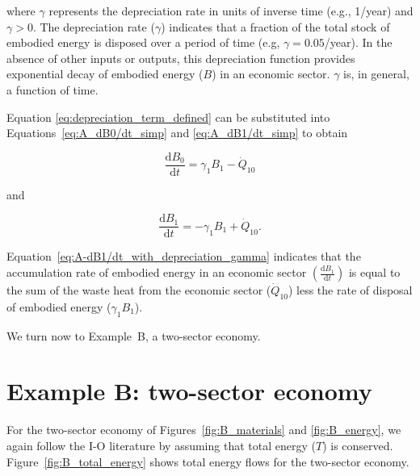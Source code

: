 \noindent where $\gamma$ represents the depreciation rate 
in units of inverse time (e.g., 1/year) and $\gamma > 0$. 
The depreciation rate ($\gamma$) indicates that 
a fraction of the total stock of embodied energy 
is disposed over a period of time (e.g, $\gamma = 0.05$/year). 
In the absence of other inputs or outputs, 
this depreciation function provides exponential decay 
of embodied energy ($B$) in an economic sector. 
$\gamma$ is, in general, a function of time.

Equation \ref{eq:depreciation_term_defined} 
can be substituted into Equations~\ref{eq:A_dB0/dt_simp}
and \ref{eq:A_dB1/dt_simp} to obtain 

\begin{equation} \label{eq:A-dB0/dt_with_depreciation_gamma}
	\frac{\mathrm{d}B_{0}}{\mathrm{d}t} 
	= \gamma_{1}B_{1}
	- \dot{Q}_{10} 
\end{equation}

\noindent and

\begin{equation} \label{eq:A-dB1/dt_with_depreciation_gamma}
	\frac{\mathrm{d}B_{1}}{\mathrm{d}t} 
	= - \gamma_{1}B_{1}
	+ \dot{Q}_{10}.
\end{equation}

\noindent Equation~\ref{eq:A-dB1/dt_with_depreciation_gamma} 
indicates that the accumulation rate 
of embodied energy in an economic sector 
$\left( \frac{\mathrm{d}B_{1}}{\mathrm{d}t} \right)$
is equal to the sum of the waste heat from the economic sector 
($\dot{Q}_{10}$) less the rate of disposal of embodied energy 
($\gamma_{1}B_{1}$).

We turn now to Example~B, a two-sector economy.


\section{Example B: two-sector economy}

For the two-sector economy of Figures~\ref{fig:B_materials}
and \ref{fig:B_energy}, we again follow the I-O literature 
by assuming that total energy ($T$) is conserved. 
Figure~\ref{fig:B_total_energy} shows total energy
flows for the two-sector economy.

